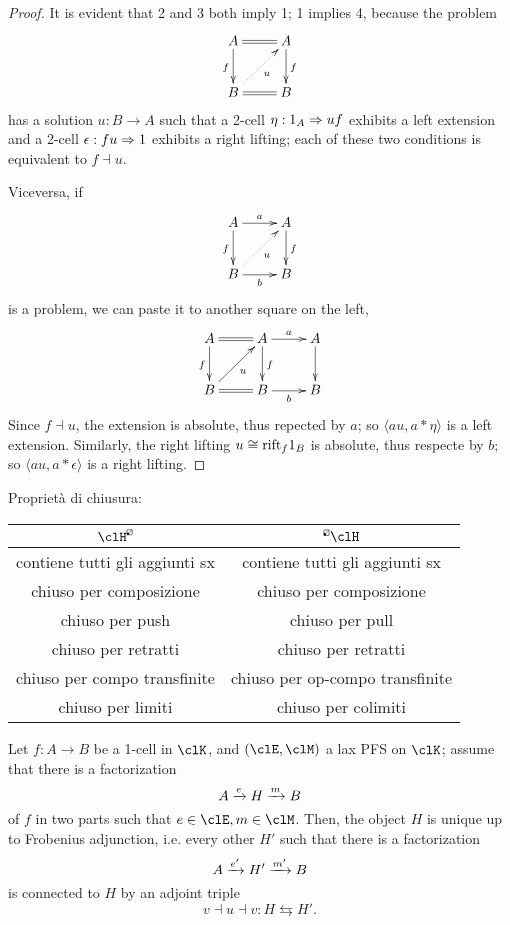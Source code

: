 \documentclass{amsart}
\newcommand{\dolp}[1]{\mathrel{
  \begin{tikzpicture}[scale=#1]
    \draw[rounded corners=.25pt, line width=.4pt] (0,0) rectangle (1,1);
    \draw[line width=.3pt] (0,0) -- (1,1);
    \fill (0,0) rectangle (.4,.4);
    \end{tikzpicture}
}}
\newcommand{\lp}{
\mathchoice{\dolp{.165}}
  {\dolp{.165}}
  {\mathrel{\dolp{.1325}}}
  {\mathrel{\dolp{.1}}}
}
\begin{document}
\begin{proof}
  It is evident that 2 and 3 both imply 1; 1 implies 4, because the problem
  \[
  \xymatrix{
    A \ar[d]_f \ar@{=}[r]& A\ar[d]^f  \\
    B \ar@{.>}[ur]_u \ar@{=}[r]& B
  }  
  \]
  has a solution $u : B \to A$ such that a 2-cell $\eta : 1_A \Rightarrow uf$ exhibits a left extension and a 2-cell $\epsilon : fu \Rightarrow 1$ exhibits a right lifting; each of these two conditions is equivalent to $f \dashv u$.

  Viceversa, if 
  \[
  \xymatrix{
    A \ar[d]_f \ar[r]^a & A\ar[d]^f  \\
    B \ar@{.>}[ur]_u \ar[r]_b & B
  }  
  \]
  is a problem, we can paste it to another square on the left, 
  \[
  \xymatrix{
    A \ar[d]_f \ar@{=}[r]& A\ar[d]^f \ar[r]^a  & A \ar[d]\\
    B \ar[ur]_u \ar@{=}[r]& B \ar[r]_b & B
  }  
  \]
  Since $f\dashv u$, the extension is absolute, thus repected by $a$; so $\langle au, a * \eta\rangle$ is a left extension. Similarly, the right lifting $u\cong\mathrm{rift}_f 1_B$ is absolute, thus respecte by $b$; so $\langle au,a * \epsilon\rangle$ is a right lifting.
\end{proof}
\begin{proposition}
  Proprietà di chiusura:
\begin{center}
  \begin{tabular}{@{}cc@{}}
  \toprule
  $\clH^{\lp}$                 & ${}^{\lp}\clH$                  \\ \midrule
  contiene tutti gli aggiunti sx       & contiene tutti gli aggiunti sx          \\
  chiuso per composizione      & chiuso per composizione         \\
  chiuso per push              & chiuso per pull                 \\
  chiuso per retratti          & chiuso per retratti             \\
  chiuso per compo transfinite & chiuso per op-compo transfinite \\ 
  chiuso per limiti & chiuso per colimiti \\ \bottomrule
  \end{tabular}
\end{center}
\end{proposition}
\begin{proposition}
  Let $f : A \to B$ be a 1-cell in $\clK$, and $(\clE,\clM)$ a lax PFS on $\clK$; assume that there is a factorization $$A \xrightarrow{e} H\xrightarrow{m} B$$ of $f$ in two parts such that $e\in\clE, m\in\clM$. Then, the object $H$ is unique up to Frobenius adjunction, i.e. every other $H'$ such that there is a factorization $$A \xrightarrow{e'} H' \xrightarrow{m'} B$$ is connected to $H$ by an adjoint triple $$v\dashv u\dashv v : H \leftrightarrows H'.$$
\end{proposition}
\end{document}
